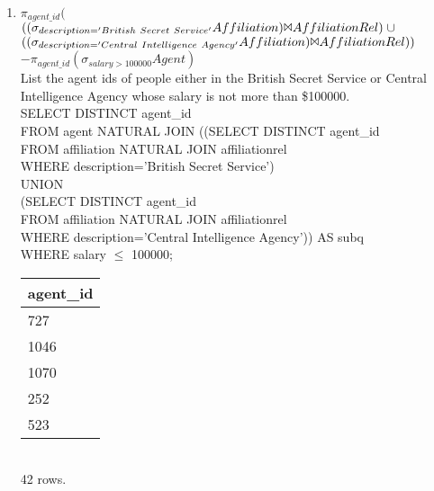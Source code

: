 \documentclass{article}
\begin{document}
\begin{enumerate}
\pagebreak

\item
$\pi_{agent\_id}($\\
$((\sigma_{description='British\ Secret\ Service'}Affiliation)
\Bowtie AffiliationRel)\; \cup$\\
$((\sigma_{description='Central\ Intelligence\ Agency'}Affiliation)
\Bowtie AffiliationRel))$\\
$ - \pi_{agent\_id}(\sigma_{salary > 100000}Agent)$\\
List the agent ids of people either in the British Secret Service or
Central Intelligence Agency whose salary is not more than \$100000.\\
SELECT DISTINCT agent\_id\\
FROM agent NATURAL JOIN ((SELECT DISTINCT agent\_id\\
\hspace*{5 cm}            FROM affiliation NATURAL JOIN affiliationrel\\
\hspace*{5 cm}            WHERE description='British Secret Service')\\
\hspace*{5 cm}            UNION\\
\hspace*{5 cm}            (SELECT DISTINCT agent\_id\\
\hspace*{5 cm}            FROM affiliation NATURAL JOIN affiliationrel\\
\hspace*{5 cm}            WHERE description='Central Intelligence Agency')) AS subq\\
WHERE salary $\leq$ 100000;\\
\begin{tabular}{l}
agent\_id \\
\hline
      727\\
     1046\\
     1070\\
      252\\
      523\\
\end{tabular}
\\42 rows.\\
\end{enumerate}
\end{document}
